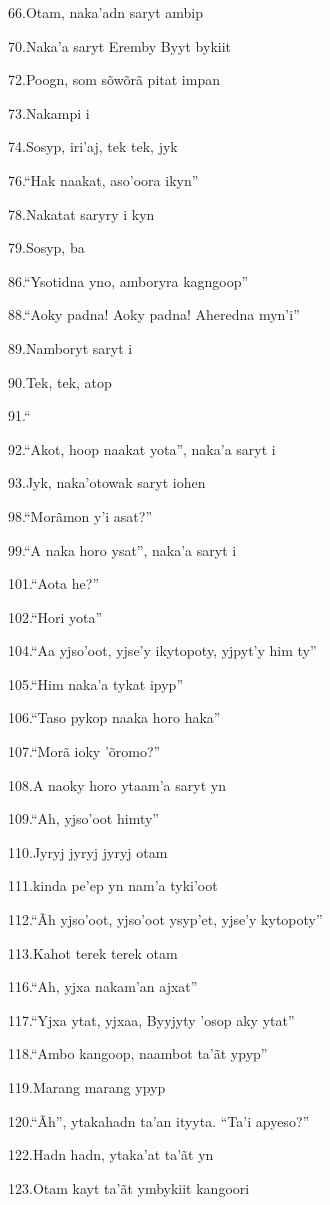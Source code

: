 66.Otam, naka'adn saryt ambip

70.Naka'a saryt Eremby Byyt bykiit

72.Poogn, som sõwõrã pitat impan

73.Nakampi i

74.Sosyp, iri'aj, tek tek, jyk

76.``Hak naakat, aso'oora ikyn''

78.Nakatat saryry i kyn

79.Sosyp, ba

86.``Ysotidna yno, amboryra kagngoop''

88.``Aoky padna! Aoky padna! Aheredna myn'i''

89.Namboryt saryt i

90.Tek, tek, atop

91.``

92.``Akot, hoop naakat yota'', naka'a saryt i

93.Jyk, naka'otowak saryt iohen

98.``Morãmon y'i asat?''

99.``A naka horo ysat'', naka'a saryt i

101.``Aota he?''

102.``Hori yota''

104.``Aa yjso'oot, yjse'y ikytopoty, yjpyt'y him ty''

105.``Him naka'a tykat ipyp''

106.``Taso pykop naaka horo haka''

107.``Morã ioky 'õromo?''

108.A naoky horo ytaam'a saryt yn

109.``Ah, yjso'oot himty''

110.Jyryj jyryj jyryj otam

111.kinda pe'ep yn nam'a tyki'oot

112.``Ãh yjso'oot, yjso'oot ysyp'et, yjse'y kytopoty''

113.Kahot terek terek otam

116.``Ah, yjxa nakam'an ajxat''

117.``Yjxa ytat, yjxaa, Byyjyty 'osop aky ytat''

118.``Ambo kangoop, naambot ta'ãt ypyp''

119.Marang marang ypyp

120.``Ãh'', ytakahadn ta'an ityyta. ``Ta'i apyeso?''

122.Hadn hadn, ytaka'at ta'ãt yn

123.Otam kayt ta'ãt ymbykiit kangoori

